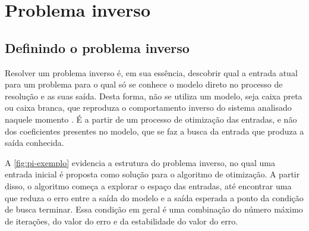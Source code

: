 \chapter{Problema inverso} \label{cha:pi}

\section{Definindo o problema inverso} \label{sec:pi-def}
Resolver um problema inverso é, em sua essência, descobrir qual a entrada atual para um problema para o qual só se conhece o modelo direto no processo de resolução e as suas saída. Desta forma, não se utiliza um modelo, seja caixa preta ou caixa branca, que reproduza o comportamento inverso do sistema analisado naquele momento \cite{ljung1999system}. É a partir de um processo de otimização das entradas, e não dos coeficientes presentes no modelo, que se faz a busca da entrada que produza a saída conhecida.

A \autoref{fig:pi-exemplo} evidencia a estrutura do problema inverso, no qual uma entrada inicial é proposta como solução para o algoritmo de otimização. A partir disso, o algoritmo começa a explorar o espaço das entradas, até encontrar uma que reduza o erro entre a saída do modelo e a saída esperada a ponto da condição de busca terminar. Essa condição em geral é uma combinação do número máximo de iterações, do valor do erro e da estabilidade do valor do erro.


